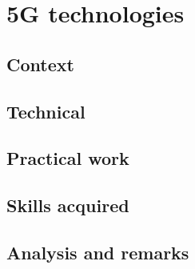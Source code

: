 \section{5G technologies}
\subsection{Context}
\subsection{Technical}
\subsection{Practical work}
\subsection{Skills acquired}
\subsection{Analysis and remarks}